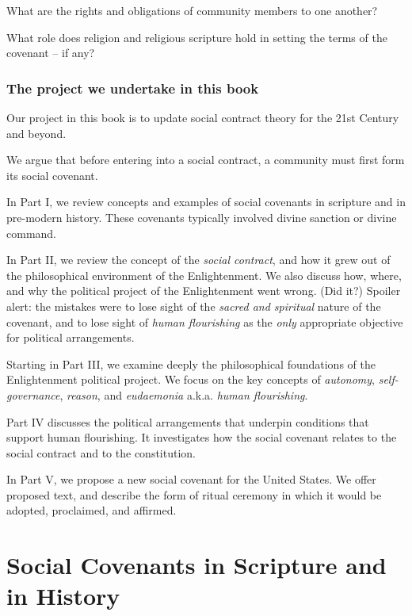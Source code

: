 \documentclass[
]{book}
\begin{document}
What are the rights and obligations of community members to one another?

What role does religion and religious scripture hold in setting the terms of the covenant -- if any?

\hypertarget{the-project-we-undertake-in-this-book}{%
\section{The project we undertake in this book}\label{the-project-we-undertake-in-this-book}}

Our project in this book is to update social contract theory for the 21st Century and beyond.

We argue that before entering into a social contract, a community must first form its social covenant.

In Part I, we review concepts and examples of social covenants in scripture and in pre-modern history. These covenants typically involved divine sanction or divine command.

In Part II, we review the concept of the \emph{social contract}, and how it grew out of the philosophical environment of the Enlightenment. We also discuss how, where, and why the political project of the Enlightenment went wrong. (Did it?) Spoiler alert: the mistakes were to lose sight of the \emph{sacred and spiritual} nature of the covenant, and to lose sight of \emph{human flourishing} as the \emph{only} appropriate objective for political arrangements.

Starting in Part III, we examine deeply the philosophical foundations of the Enlightenment political project. We focus on the key concepts of \emph{autonomy}, \emph{self-governance}, \emph{reason}, and \emph{eudaemonia} a.k.a. \emph{human flourishing}.

Part IV discusses the political arrangements that underpin conditions that support human flourishing. It investigates how the social covenant relates to the social contract and to the constitution.

In Part V, we propose a new social covenant for the United States. We offer proposed text, and describe the form of ritual ceremony in which it would be adopted, proclaimed, and affirmed.

\hypertarget{part-social-covenants-in-scripture-and-in-history}{%
\part{Social Covenants in Scripture and in History}\label{part-social-covenants-in-scripture-and-in-history}}
\end{document}
